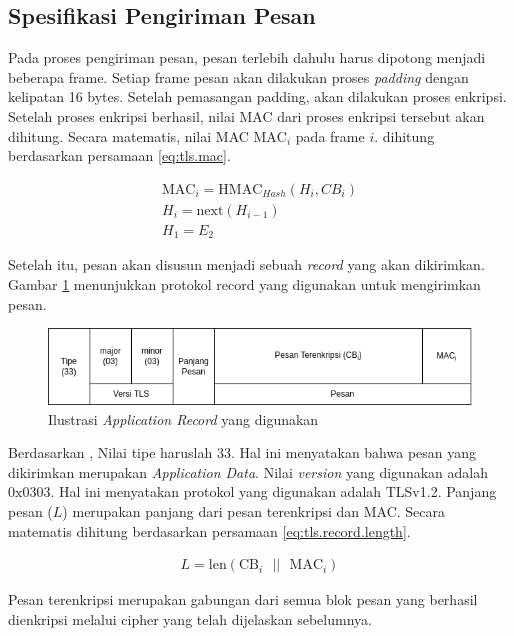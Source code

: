 \subsection{Spesifikasi Pengiriman Pesan}

Pada proses pengiriman pesan, pesan terlebih dahulu harus dipotong menjadi beberapa frame. Setiap frame pesan akan dilakukan proses \emph{padding} dengan kelipatan 16 bytes. Setelah pemasangan padding, akan dilakukan proses enkripsi. Setelah proses enkripsi berhasil, nilai MAC dari proses enkripsi tersebut akan dihitung. Secara matematis, nilai MAC $\text{MAC}_i$ pada frame $i$. dihitung berdasarkan persamaan \ref{eq:tls.mac}.

\begin{equation}
  \begin{aligned}
    \text{MAC}_i = \text{HMAC}_{Hash}(H_i, CB_i) \\
    H_i = \text{next}(H_{i-1}) \\
    H_1 = E_2
  \end{aligned}
  \label{eq:tls.mac}
\end{equation}


Setelah itu, pesan akan disusun menjadi sebuah \emph{record} yang akan dikirimkan. Gambar \ref{fig:tls.application.rec} menunjukkan protokol record yang digunakan untuk mengirimkan pesan.

\begin{figure}[!h]
  \centering
  \includegraphics[width=\textwidth]{chapters/res/chapter-3/img/tls.application.record.png}
  \caption{Ilustrasi \emph{Application Record} yang digunakan} \label{fig:tls.application.rec}
\end{figure}

Berdasarkan \textcite{rfc5246}, Nilai tipe haruslah 33. Hal ini menyatakan bahwa pesan yang dikirimkan merupakan \emph{Application Data}. Nilai \emph{version} yang digunakan adalah $\text{0x0303}$. Hal ini menyatakan protokol yang digunakan adalah TLSv1.2. Panjang pesan ($L$) merupakan panjang dari pesan terenkripsi dan MAC. Secara matematis dihitung berdasarkan persamaan \ref{eq:tls.record.length}.

\begin{equation}
  \begin{aligned}
    L = \text{len}(\text{CB}_i\text{ }||\text{ }\text{MAC}_i)
  \end{aligned}
  \label{eq:tls.record.length}
\end{equation}

Pesan terenkripsi merupakan gabungan dari semua blok pesan yang berhasil dienkripsi melalui cipher yang telah dijelaskan sebelumnya.
